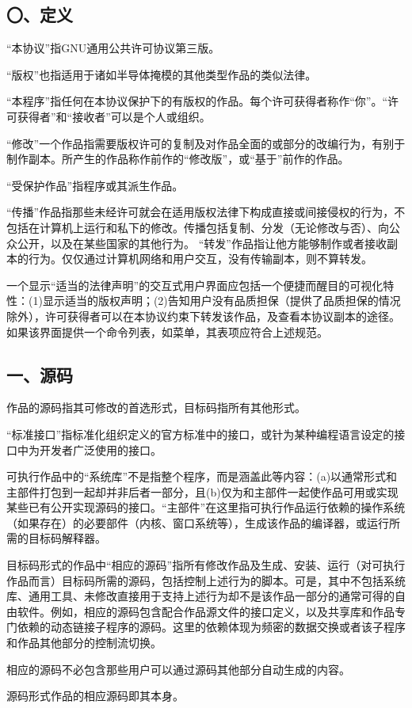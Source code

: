 \subsection{〇、定义}
“本协议”指GNU通用公共许可协议第三版。\par
“版权”也指适用于诸如半导体掩模的其他类型作品的类似法律。\par
“本程序”指任何在本协议保护下的有版权的作品。每个许可获得者称作“你”。“许可获得者”和“接收者”可以是个人或组织。\par
“修改”一个作品指需要版权许可的复制及对作品全面的或部分的改编行为，有别于制作副本。所产生的作品称作前作的“修改版”，或“基于”前作的作品。\par
“受保护作品”指程序或其派生作品。\par
“传播”作品指那些未经许可就会在适用版权法律下构成直接或间接侵权的行为，不包括在计算机上运行和私下的修改。传播包括复制、分发（无论修改与否）、向公众公开，以及在某些国家的其他行为。
“转发”作品指让他方能够制作或者接收副本的行为。仅仅通过计算机网络和用户交互，没有传输副本，则不算转发。\par
一个显示“适当的法律声明”的交互式用户界面应包括一个便捷而醒目的可视化特性：(1)显示适当的版权声明；(2)告知用户没有品质担保（提供了品质担保的情况除外），许可获得者可以在本协议约束下转发该作品，及查看本协议副本的途径。如果该界面提供一个命令列表，如菜单，其表项应符合上述规范。
\subsection{一、源码}
作品的源码指其可修改的首选形式，目标码指所有其他形式。\par
“标准接口”指标准化组织定义的官方标准中的接口，或针为某种编程语言设定的接口中为开发者广泛使用的接口。\par
可执行作品中的“系统库”不是指整个程序，而是涵盖此等内容：(a)以通常形式和主部件打包到一起却并非后者一部分，且(b)仅为和主部件一起使作品可用或实现某些已有公开实现源码的接口。“主部件”在这里指可执行作品运行依赖的操作系统（如果存在）的必要部件（内核、窗口系统等），生成该作品的编译器，或运行所需的目标码解释器。\par
目标码形式的作品中“相应的源码”指所有修改作品及生成、安装、运行（对可执行作品而言）目标码所需的源码，包括控制上述行为的脚本。可是，其中不包括系统库、通用工具、未修改直接用于支持上述行为却不是该作品一部分的通常可得的自由软件。例如，相应的源码包含配合作品源文件的接口定义，以及共享库和作品专门依赖的动态链接子程序的源码。这里的依赖体现为频密的数据交换或者该子程序和作品其他部分的控制流切换。\par
相应的源码不必包含那些用户可以通过源码其他部分自动生成的内容。\par
源码形式作品的相应源码即其本身。
